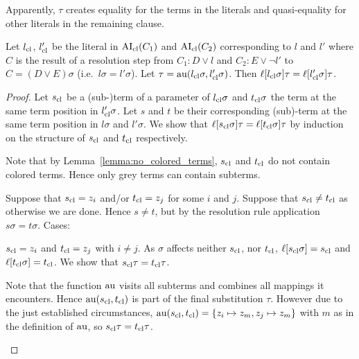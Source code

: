 \documentclass[,%
	paper=a4,%
	DIV15, 
	liststotoc,
	bibtotoc,
	draft=false,%
	numbers=noendperiod
]{scrartcl}
\begin{document}
Apparently, $\tau$ creates equality for the terms in the literals and quasi-equality for other literals in the remaining clause.
\begin{lemma}
	Let $l_\mathrm{cl}$, $l_\mathrm{cl}'$ be the literal in $\operatorname{AI}_\mathrm{cl}(C_1)$ and $\operatorname{AI}_\mathrm{cl}(C_2)$ corresponding to $l$ and $l'$ where 
	$C$ is the result of a resolution step from $C_1: D\lor l$ and $C_2: E\lor \lnot l'$ to $C = (D \lor E)\sigma$
(i.e.~$l\sigma=l'\sigma$).
Let $\tau = \operatorname{au}(l_\mathrm{cl}\sigma, l_\mathrm{cl}'\sigma)$. Then $\ell[l_\mathrm{cl}\sigma]\tau = \ell[l_\mathrm{cl}'\sigma]\tau$.
\label{lemma:literals_clauses_equal}
\end{lemma}
\begin{proof} 
	Let $s_\mathrm{cl}$ be a (sub-)term of a parameter of $l_\mathrm{cl}\sigma$ and $t_\mathrm{cl}\sigma$ the term at the same term position in $l_\mathrm{cl}'\sigma$. Let $s$ and $t$ be their corresponding (sub)-term at the same term position in $l\sigma$ and $l'\sigma$.
We show that $\ell[s_\mathrm{cl}\sigma]\tau = \ell[t_\mathrm{cl}\sigma]\tau$ by induction on the structure of $s_\mathrm{cl}$ and $t_\mathrm{cl}$ respectively.

	Note that by Lemma~\ref{lemma:no_colored_terms}, $s_\mathrm{cl}$ and $t_\mathrm{cl}$ do not contain colored terms. Hence only grey terms can contain subterms.

	Suppose that $s_\mathrm{cl} = z_i$ and/or $t_\mathrm{cl} = z_j$ for some $i$ and $j$.
	Suppose that $s_\mathrm{cl} \neq t_\mathrm{cl}$ as otherwise we are done.
	Hence $s\neq t$, but by the resolution rule application $s\sigma = t\sigma$. Cases:
	\begin{compactitem}
		\item $s_\mathrm{cl} = z_i$ and $t_\mathrm{cl} = z_j$ with $i\neq j$.
					As $\sigma$ affects neither $s_\mathrm{cl}$, nor $t_\mathrm{cl}$,
					$\ell[s_\mathrm{cl} \sigma]  = s_\mathrm{cl}$ and
					$\ell[t_\mathrm{cl} \sigma]  = t_\mathrm{cl}$.
					We show that $s_\mathrm{cl}\tau = t_\mathrm{cl}\tau$.

					Note that the function $\operatorname{au}$ visits all subterms and combines all mappings it encounters.
					Hence $\operatorname{au}(s_\mathrm{cl}, t_\mathrm{cl})$ is part of the final substitution $\tau$.
					However due to the just established circumstances, $\operatorname{au}(s_\mathrm{cl}, t_\mathrm{cl}) = \{z_i \mapsto z_m, z_j \mapsto z_m\}$ with $m$ as in the definition of $\operatorname{au}$, so $s_\mathrm{cl}\tau = t_\mathrm{cl}\tau$.


\end{compactitem}
\end{proof}
\end{document}
